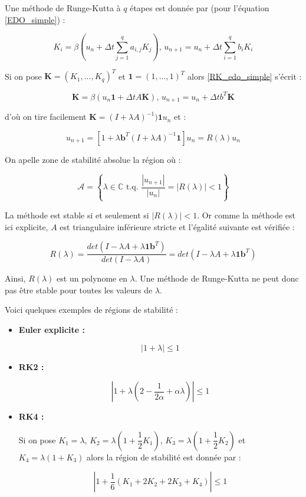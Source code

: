 \documentclass[10pt,a4paper]{amsart}
\begin{document}
Une méthode de Runge-Kutta à $q$ étapes est donnée par (pour l'équation \eqref{EDO_simple}) :

\begin{equation}\label{RK_edo_simple}
K_i = \beta \left( u_n + \Delta t \sum_{j=1}^{q} a_{i,j}K_j \right) \text{, } u_{n+1} = u_n + \Delta t \sum_{i=1}^q b_i K_i
\end{equation}

Si on pose $\bm{K} = (K_1, ..., K_q)^T$ et $\bm{1} = (1, ..., 1)^T$ alors \eqref{RK_edo_simple} s'écrit :

\begin{equation}\label{RK_matriciel}
\bm{K} = \beta \left( u_n \bm{1} + \Delta t A \bm{K} \right) \text{, } u_{n+1} = u_n + \Delta t b^T \bm{K}
\end{equation}

d'où on tire facilement $\bm{K} = (I + \lambda A)^{-1}) \bm{1} u_n$ et :

$$u_{n+1} = \left[ 1 + \lambda \bm{b}^T (I + \lambda A)^{-1} \bm{1} \right] u_n = R(\lambda) u_n $$

On apelle zone de stabilité absolue la région où :

$$\mathcal{A} = \left\{ \lambda \in \mathbb{C} \text{ t.q. } \dfrac{|u_{n+1}|}{|u_n|} = |R(\lambda)| < 1 \right\}$$

La méthode est stable si et seulement si $|R(\lambda)| < 1$. Or comme la méthode est ici explicite, $A$ est triangulaire inférieure stricte et l'égalité suivante est vérifiée :

$$R(\lambda) = \dfrac{det(I - \lambda A + \lambda \bm{1} \bm{b}^T)}{det(I - \lambda A)} = det(I - \lambda A + \lambda \bm{1} \bm{b}^T)$$

Ainsi, $R(\lambda)$ est un polynome en $\lambda$. Une méthode de Runge-Kutta ne peut donc pas être stable pour toutes les valeurs de $\lambda$.

Voici quelques exemples de régions de stabilité :



\begin{itemize}
\item \textbf{Euler explicite : }

$$|1 + \lambda| \leq 1$$

\item \textbf{RK2 :}

$$|1+\lambda(2 - \dfrac{1}{2 \alpha} + \alpha \lambda)| \leq 1$$

\item \textbf{RK4 :}

Si on pose $K_1 = \lambda$, $K_2 = \lambda (1 + \dfrac{1}{2}K_1)$, $K_3 = \lambda (1 + \dfrac{1}{2}K_2)$ et $K_4 = \lambda (1 + K_3)$ alors la région de stabilité est donnée par :

$$|1 + \dfrac{1}{6} \left( K_1 + 2 K_2 + 2 K_3 + K_4 \right)| \leq 1$$
\end{itemize}
\end{document}
